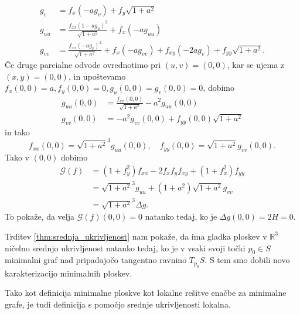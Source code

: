 \documentclass[fin1, tisk, bibtex]{fmfdelo}
\begin{document}
\begin{dokaz}
\begin{align*}
        g_v & =f_x\left(-a g_v\right)+f_y \sqrt{1+a^2} \\
        g_{u u} & =\frac{f_{x x}\left(1-a g_u\right)^2}{\sqrt{1+a^2}}+f_x\left(-a g_{u u}\right) \\
        g_{v v} & =\frac{f_{x x}\left(-a g_v\right)^2}{\sqrt{1+a^2}}+f_x\left(-a g_{v v}\right)+f_{x y}\left(-2 a g_v\right)+f_{y y} \sqrt{1+a^2} .
    \end{align*}
    Če druge parcialne odvode ovrednotimo pri $(u, v)=(0,0)$, kar se ujema z $(x, y)=(0,0)$, in upoštevamo $f_x(0,0)=a, f_y(0,0)=0, g_u(0,0)=g_v(0,0)=0$, dobimo 
    \begin{align*}
        g_{u u}(0,0) & =\frac{f_{x x}(0,0)}{\sqrt{1+a^2}}-a^2 g_{u u}(0,0) \\
        g_{v v}(0,0) & =-a^2 g_{v v}(0,0)+f_{y y}(0,0) \sqrt{1+a^2}
    \end{align*}
    in tako 
    \begin{equation*}
        f_{x x}(0,0)={\sqrt{1+a^2}}^3 g_{u u}(0,0), \quad f_{y y}(0,0)=\sqrt{1+a^2} g_{v v}(0,0).
    \end{equation*}
    Tako v $(0,0)$ dobimo
    \begin{align*}
        \mathcal{G}(f) & =\left(1+f_y^2\right) f_{x x}-2 f_x f_y f_{x y}+\left(1+f_x^2\right) f_{y y} \\
        & ={\sqrt{1+a^2}}^3 g_{u u}+\left(1+a^2\right) \sqrt{1+a^2} g_{v v} \\
        & ={\sqrt{1+a^2}}^3 \Delta g .
    \end{align*}
    To pokaže, da velja $\mathcal{G}(f)(0,0)=0$ natanko tedaj, ko je $\Delta g(0,0)=2H=0$.
\end{dokaz}
Trditev \ref{thm:srednja_ukrivljenost} nam pokaže, da ima gladka ploskev v $\mathbb{R}^3$ ničelno srednjo ukrivljenost natanko tedaj, ko je v vsaki svoji točki $p_0 \in S$ minimalni graf nad pripadajočo tangentno ravnino $T_{p_0} S$. S tem smo dobili novo karakterizacijo minimalnih ploskev.

\begin{opomba}
    Tako kot definicija minimalne ploskve kot lokalne rešitve enačbe za minimalne grafe, je tudi definicija s pomočjo srednje ukrivljenosti lokalna. 
    
\end{opomba}
\end{document}
